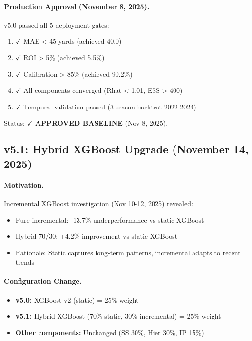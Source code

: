 \paragraph{Production Approval (November 8, 2025).}
v5.0 passed all 5 deployment gates:
\begin{enumerate}[itemsep=2pt,parsep=0pt]
    \item $\checkmark$ MAE < 45 yards (achieved 40.0)
    \item $\checkmark$ ROI > 5\% (achieved 5.5\%)
    \item $\checkmark$ Calibration > 85\% (achieved 90.2\%)
    \item $\checkmark$ All components converged (Rhat < 1.01, ESS > 400)
    \item $\checkmark$ Temporal validation passed (3-season backtest 2022-2024)
\end{enumerate}

Status: $\checkmark$ \textbf{APPROVED BASELINE} (Nov 8, 2025).

\subsection{v5.1: Hybrid XGBoost Upgrade (November 14, 2025)}

\paragraph{Motivation.}
Incremental XGBoost investigation (Nov 10-12, 2025) revealed:
\begin{itemize}[itemsep=2pt,parsep=0pt]
    \item Pure incremental: -13.7\% underperformance vs static XGBoost
    \item Hybrid 70/30: +4.2\% improvement vs static XGBoost
    \item Rationale: Static captures long-term patterns, incremental adapts to recent trends
\end{itemize}

\paragraph{Configuration Change.}
\begin{itemize}[itemsep=2pt,parsep=0pt]
    \item \textbf{v5.0:} XGBoost v2 (static) = 25\% weight
    \item \textbf{v5.1:} Hybrid XGBoost (70\% static, 30\% incremental) = 25\% weight
    \item \textbf{Other components:} Unchanged (SS 30\%, Hier 30\%, IP 15\%)
\end{itemize}

